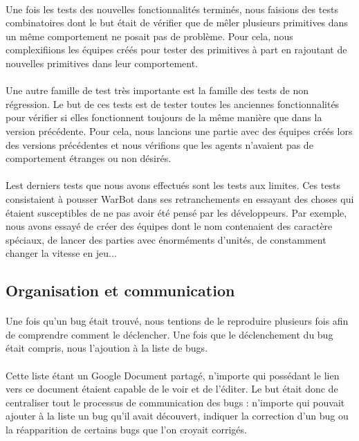 \documentclass{report}
\begin{document}
\paragraph{}
  Une fois les tests des nouvelles fonctionnalités terminés, nous faisions des tests combinatoires dont le but était de vérifier que de mêler plusieurs primitives dans un même comportement ne posait pas de problème. Pour cela, nous complexifiions les équipes créés pour tester des primitives à part en rajoutant de nouvelles primitives dans leur comportement.
 \paragraph{}
  Une autre famille de test très importante est la famille des tests de non régression. Le but de ces tests est de tester toutes les anciennes fonctionnalités pour vérifier si elles fonctionnent toujours de la même manière que dans la version précédente. Pour cela, nous lancions une partie avec des équipes créés lors des versions précédentes et nous vérifions que les agents n’avaient pas de comportement étranges ou non désirés.
\paragraph{}
  Lest derniers tests que nous avons effectués sont les tests aux limites. Ces tests consistaient à pousser WarBot dans ses retranchements en essayant des choses qui étaient susceptibles de ne pas avoir été pensé par les développeurs. Par exemple, nous avons essayé de créer des équipes dont le nom contenaient des caractère spéciaux, de lancer des parties avec énorméments d’unités, de constamment changer la vitesse en jeu...

\subsection{Organisation et communication}
\paragraph{}
  Une fois qu’un bug était trouvé, nous tentions de le reproduire plusieurs fois afin de comprendre comment le déclencher. Une fois que le déclenchement du bug était compris, nous l’ajoution à la liste de bugs.
\paragraph{}
  Cette liste étant un Google Document partagé, n’importe qui possédant le lien vers ce document étaient capable de le voir et de l’éditer. Le but était donc de centraliser tout le processus de communication des bugs : n’importe qui pouvait ajouter à la liste un bug qu’il avait découvert, indiquer la correction d'un bug ou la réapparition de certains bugs que l'on croyait corrigés.
\end{document}
